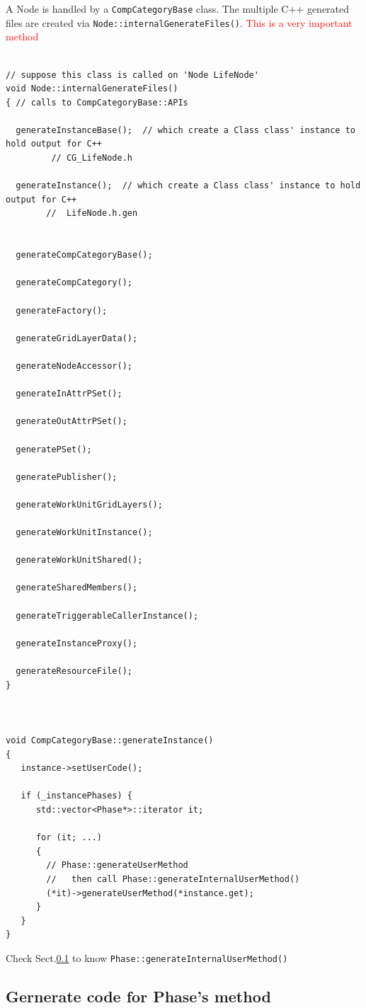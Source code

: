 A Node is handled by a \verb!CompCategoryBase! class. The multiple C++ generated
files are created via \verb!Node::internalGenerateFiles()!.
\textcolor{red}{This is a very important method}
\begin{verbatim}

// suppose this class is called on 'Node LifeNode' 
void Node::internalGenerateFiles()
{ // calls to CompCategoryBase::APIs

  generateInstanceBase();  // which create a Class class' instance to hold output for C++ 
         // CG_LifeNode.h
  
  generateInstance();  // which create a Class class' instance to hold output for C++
        //  LifeNode.h.gen

  
  generateCompCategoryBase();
  
  generateCompCategory();
  
  generateFactory();
  
  generateGridLayerData();
  
  generateNodeAccessor();
  
  generateInAttrPSet();
  
  generateOutAttrPSet();
  
  generatePSet();
  
  generatePublisher();
  
  generateWorkUnitGridLayers();
  
  generateWorkUnitInstance();
  
  generateWorkUnitShared();
  
  generateSharedMembers();
  
  generateTriggerableCallerInstance();
  
  generateInstanceProxy();
  
  generateResourceFile();
}



void CompCategoryBase::generateInstance()
{
   instance->setUserCode();
   
   if (_instancePhases) {
      std::vector<Phase*>::iterator it;
      
      for (it; ...)
      {
        // Phase::generateUserMethod
        //   then call Phase::generateInternalUserMethod()
        (*it)->generateUserMethod(*instance.get);
      }
   }
}
\end{verbatim}
Check Sect.\ref{sec:Phase-method-C++-generated} to know \verb!Phase::generateInternalUserMethod()!

\subsection{Gernerate code for Phase's method}
\label{sec:Phase-method-C++-generated}
\label{sec:Phase-MDL-class}

